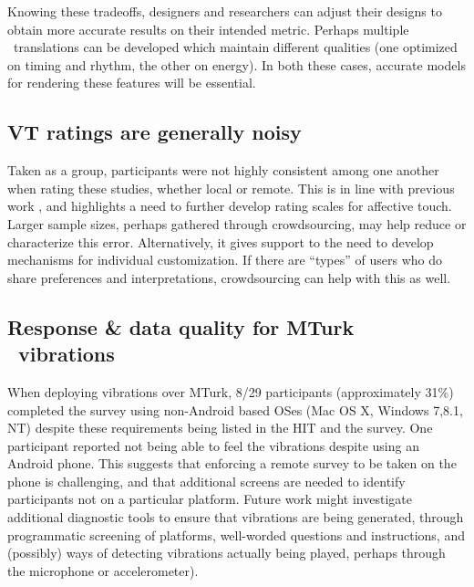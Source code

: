      Knowing these tradeoffs, designers and researchers can adjust their designs to obtain more accurate results on their intended metric. 
     Perhaps multiple \lofi\ translations can be developed which maintain different qualities (one optimized on timing and rhythm, the other on energy).
     In both these cases, accurate models for rendering these features will be essential.
        
        
		
	\subsection{VT %
	 ratings are generally noisy }
   Taken as a group, participants were not highly consistent among one another when rating these %
    studies, whether local or remote.
  This is in line with previous work \cite{Seifi2015}, and highlights a need to further develop rating scales for affective touch.
   Larger sample sizes, perhaps gathered through crowdsourcing, may help reduce or characterize this error. Alternatively, it gives support to the need to develop mechanisms for individual customization. If there are ``types'' of users who do share preferences and interpretations, crowdsourcing can help with this as well.
   
\subsection{Response \& data quality for MTurk \lofi\ vibrations }
When deploying vibrations over MTurk, 8/29 participants (approximately 31\%) completed the survey using non-Android based OSes (Mac OS X, Windows 7,8.1, NT) despite these requirements being listed in the HIT and the survey. One participant reported not being able to feel the vibrations despite using an Android phone. 
This suggests that enforcing a remote survey to be taken on the phone is challenging, and that additional screens are needed to identify participants not on a particular platform.
Future work might investigate additional diagnostic tools to ensure that vibrations are being generated, through programmatic screening of platforms, well-worded questions and instructions, and (possibly) ways of detecting vibrations actually being played, perhaps through the microphone or accelerometer).



